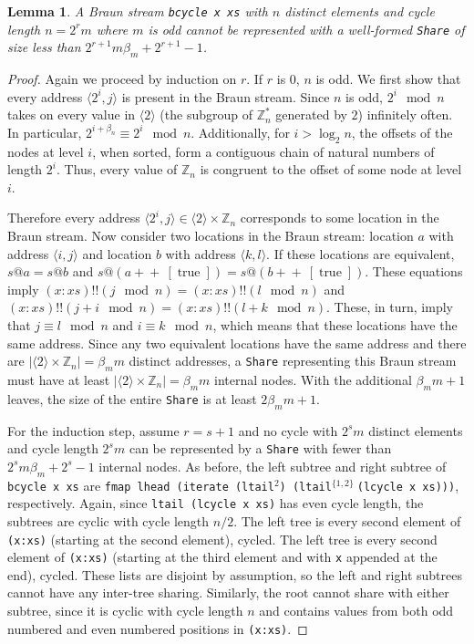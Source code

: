 \documentclass[envcountsect]{llncs}
\DeclareMathOperator{\true}{true}
\newcommand{\app}{+\!\!\!+\ }
\newcommand{\share}{{\tt Share} }
\newtheorem{lemma}[theorem]{Lemma}
\begin{document}
\begin{lemma}
\label{cycleSizeMin}
A Braun stream {\tt bcycle x xs} with $n$ distinct elements and cycle length $n = 2^r m$ where $m$ is odd cannot be represented with a well-formed \share of size less than $2^{r+1} m \beta_m + 2^{r+1} - 1$.
\end{lemma}
\begin{proof}

Again we proceed by induction on $r$.
If $r$ is $0$, $n$ is odd.
We first show that every address $\langle 2^i,j \rangle$ is present in the Braun stream.
Since $n$ is odd, $2^i \mod n$ takes on every value in $\langle 2 \rangle$ (the subgroup of $\mathbb{Z}_n^*$ generated by $2$) infinitely often.
In particular, $2^{i+\beta_n} \equiv 2^i \mod n$.
Additionally, for $i > \log_2 n$, the offsets of the nodes at level $i$, when sorted, form a contiguous chain of natural numbers of length $2^i$.
Thus, every value of $\mathbb{Z}_n$ is congruent to the offset of some node at level $i$.

Therefore every address $\langle 2^i,j \rangle \in \langle 2 \rangle \times \mathbb{Z}_n$ corresponds to some location in the Braun stream.
Now consider two locations in the Braun stream: location $a$ with address $\langle i,j \rangle$ and location $b$ with address $\langle k,l \rangle$.
If these locations are equivalent, $s@a = s@b$ and $s@(a \app [\true]) = s@(b \app [\true])$.
These equations imply $(x:xs) !! (j\mod n) = (x:xs) !! (l\mod n)$ and $(x:xs) !! (j+i\mod n) = (x:xs) !! (l+k\mod n)$.
These, in turn, imply that $j \equiv l \mod n$ and $i \equiv k \mod n$, which means that these locations have the same address.
Since any two equivalent locations have the same address and there are $|\langle 2 \rangle \times \mathbb{Z}_n| = \beta_m m$ distinct addresses, a \share representing this Braun stream must have at least $|\langle 2 \rangle \times \mathbb{Z}_n| = \beta_m m$ internal nodes.
With the additional $\beta_m m + 1$ leaves, the size of the entire \share is at least $2 \beta_m m + 1$.

For the induction step, assume $r = s+1$ and no cycle with $2^s m$ distinct elements and cycle length $2^s m$ can be represented by a \share with fewer than $2^s m \beta_m + 2^s - 1$ internal nodes.
As before, the left subtree and right subtree of {\tt bcycle x xs} are {\tt fmap lhead (iterate (ltail}$^2${\tt ) (ltail}$^{\{1,2\}}\ ${\tt (lcycle x xs)))}, respectively.
Again, since {\tt ltail (lcycle x xs)} has even cycle length, the subtrees are cyclic with cycle length $n/2$.
The left tree is every second element of {\tt (x:xs)} (starting at the second element), cycled.
The left tree is every second element of {\tt (x:xs)} (starting at the third element and with {\tt x} appended at the end), cycled.
These lists are disjoint by assumption, so the left and right subtrees cannot have any inter-tree sharing.
Similarly, the root cannot share with either subtree, since it is cyclic with cycle length $n$ and contains values from both odd numbered and even numbered positions in {\tt (x:xs)}.


\end{proof}
\end{document}

